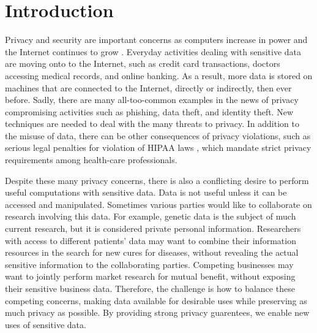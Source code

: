 
\chapter{Introduction}
\begin{quote}
%
\begin{comment}
\begin{quote}
As every man goes through life he fills in a number of forms for the
record, each containing a number of questions... There are thus hundreds
of little threads radiating from every man, millions of threads in
all. If these threads were suddenly to become visible, the whole sky
would look like a spider's web, and if they materialized as rubber
bands, buses; trams and even people would all lose the ability to
move, and the wind would be unable to carry torn-up newspapers or
autumn leaves along the streets of the city. They are not visible,
they are not material, but every man is constantly aware of their
existence.... Each man, permanently aware of his own invisible threads,
naturally develops a respect for the people who manipulate the threads.

--Alexander Solzhenitsyn, Cancer Ward, 1968.
\end{quote}

\end{comment}
{}
\end{quote}
Privacy and security are important concerns as computers increase
in power and the Internet continues to grow \cite{cra99,tur03}. Everyday
activities dealing with sensitive data are moving onto to the Internet,
such as credit card transactions, doctors accessing medical records,
and online banking. As a result, more data is stored on machines that
are connected to the Internet, directly or indirectly, then ever before.
Sadly, there are many all-too-common examples in the news of
privacy compromising activities such as phishing, data theft, and
identity theft. New techniques are needed to deal with the many threats
to privacy. In addition to the misuse of data, there can be other
consequences of privacy violations, such as serious legal penalties
for violation of HIPAA laws \cite{hippa}, which mandate strict privacy
requirements among health-care professionals.

Despite these many privacy concerns, there is also a conflicting desire
to perform useful computations with sensitive data. Data is not useful
unless it can be accessed and manipulated. Sometimes various parties
would like to collaborate on research involving this data. For
example, genetic data is the subject of much current research, but
it is considered private personal information. Researchers with access
to different patients' data may want to combine their information
resources in the search for new cures for diseases, without revealing
the actual sensitive information to the collaborating parties. Competing
businesses may want to jointly perform market research for mutual
benefit, without exposing their sensitive business data. Therefore,
the challenge
is how to balance these competing concerns, making data available
for desirable uses while preserving as much privacy as possible.  By
providing strong privacy guarentees, we enable new uses of sensitive data.

